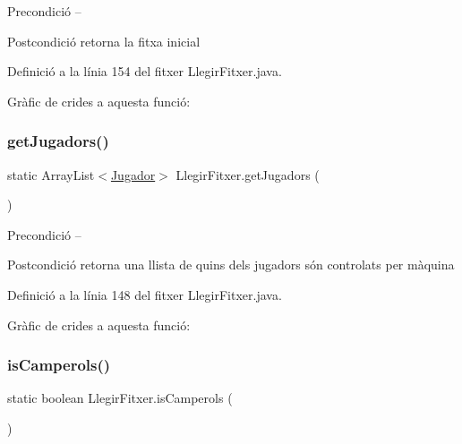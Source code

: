 \begin{DoxyPrecond}{Precondició}
-- 
\end{DoxyPrecond}
\begin{DoxyPostcond}{Postcondició}
retorna la fitxa inicial 
\end{DoxyPostcond}


Definició a la línia 154 del fitxer Llegir\+Fitxer.\+java.

Gràfic de crides a aquesta funció\+:
\mbox{\label{class_llegir_fitxer_a0917d49b907c21ed5a904ddd818372b9}} 
\subsubsection{\texorpdfstring{get\+Jugadors()}{getJugadors()}}
{\footnotesize\ttfamily static Array\+List$<$\mbox{\hyperlink{class_jugador}{Jugador}}$>$ Llegir\+Fitxer.\+get\+Jugadors (\begin{DoxyParamCaption}{ }\end{DoxyParamCaption})\hspace{0.3cm}{\ttfamily [static]}}

\begin{DoxyPrecond}{Precondició}
-- 
\end{DoxyPrecond}
\begin{DoxyPostcond}{Postcondició}
retorna una llista de quins dels jugadors són controlats per màquina 
\end{DoxyPostcond}


Definició a la línia 148 del fitxer Llegir\+Fitxer.\+java.

Gràfic de crides a aquesta funció\+:
\mbox{\label{class_llegir_fitxer_a72bf8be585313571b794f533c5a6b449}} 
\subsubsection{\texorpdfstring{is\+Camperols()}{isCamperols()}}
{\footnotesize\ttfamily static boolean Llegir\+Fitxer.\+is\+Camperols (\begin{DoxyParamCaption}{ }\end{DoxyParamCaption})\hspace{0.3cm}{\ttfamily [static]}}

